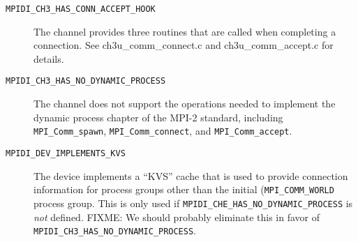 \documentclass{report}
\begin{document}
\begin{description}
\item[\texttt{MPIDI\_CH3\_HAS\_CONN\_ACCEPT\_HOOK}]
The channel provides three routines that are called when completing a
connection.  See ch3u\_comm\_connect.c and ch3u\_comm\_accept.c for
details.

\item[\texttt{MPIDI\_CH3\_HAS\_NO\_DYNAMIC\_PROCESS}]
The channel does not support the operations needed to implement the
dynamic process chapter of the MPI-2 standard, including
\texttt{MPI\_Comm\_spawn}, \texttt{MPI\_Comm\_connect}, and
\texttt{MPI\_Comm\_accept}. 

\item[\texttt{MPIDI\_DEV\_IMPLEMENTS\_KVS}]
The device implements a ``KVS'' cache that is used to provide
connection information for process groups other than the initial
(\texttt{MPI\_COMM\_WORLD} process group.  This is only used if
\texttt{MPIDI\_CHE\_HAS\_NO\_DYNAMIC\_PROCESS} is \emph{not} defined.
FIXME: We should probably eliminate this in favor of
\texttt{MPIDI\_CH3\_HAS\_NO\_DYNAMIC\_PROCESS}.

\end{description}
\end{document}
